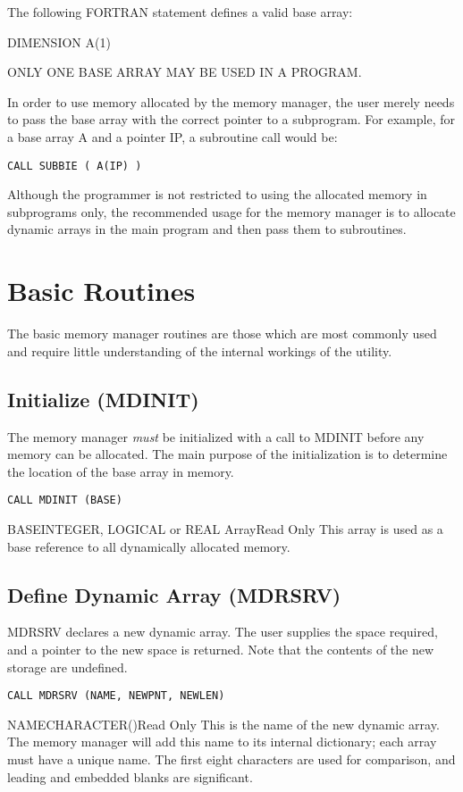 The following FORTRAN statement defines a valid base array:

DIMENSION A(1)

ONLY ONE BASE ARRAY MAY BE USED IN A PROGRAM.

In order to use memory allocated by the memory manager, the user merely
needs to pass the base array with the correct pointer to a subprogram.  For
example, for a base array A and a pointer IP, a subroutine call would be:

\verb+CALL SUBBIE ( A(IP) )+

Although the programmer is not restricted to using the allocated memory in
subprograms only, the recommended usage for the memory manager is to
allocate dynamic arrays in the main program and then pass them to
subroutines.


\section{Basic Routines}\label{sec:mbas}
The basic memory manager routines are those which are most commonly used and
require little understanding of the internal workings of the utility.

\subsection{Initialize (MDINIT)}
The memory manager {\em must} be initialized with a call to MDINIT before
any memory can be allocated.  The main purpose of the initialization is to
determine the location of the base array in memory. 

\verb+CALL MDINIT (BASE)+

\begin{argy}{BASE}{INTEGER, LOGICAL or REAL Array}{Read Only}
This array is used as a base reference to all dynamically allocated memory. 
\end{argy}

\subsection{Define Dynamic Array (MDRSRV)}
MDRSRV declares a new dynamic array.  The user supplies the space required,
and a pointer to the new space is returned.  Note that the contents of the
new storage are undefined.

\verb+CALL MDRSRV (NAME, NEWPNT, NEWLEN)+

\begin{argy}{NAME}{CHARACTER\last(\last)}{Read Only}
This is the name of the new dynamic array. The memory manager will add this
name to its internal dictionary; each array must have a unique name.  The
first eight characters are used for comparison, and leading and embedded
blanks are significant. 
\end{argy}

